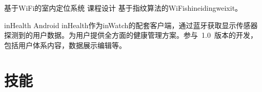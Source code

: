 \documentclass[11pt,a4paper]{moderncv}
\begin{document}
\vspace*{0.2\baselineskip}
{基于WiFi的室内定位系统}
{课程设计}
{}{}
{基于指纹算法的WiFishineidingweixit。}

\vspace*{0.2\baselineskip}
{inHealth}
{Android}
{}{}
{inHealth作为inWatch的配套客户端，通过蓝牙获取显示传感器探测到的用户数据。为用户提供全方面的健康管理方案。参与~1.0~版本的开发，包括用户体系内容，数据展示编辑等。}



\section{技能}


\closesection{}                   %
\renewcommand{\listitemsymbol}{-} %
\end{document}
